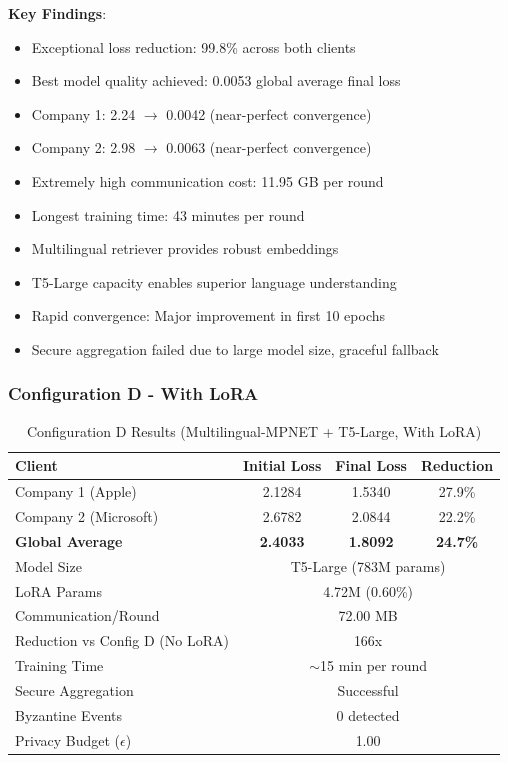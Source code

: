 \documentclass[conference]{IEEEtran}
\begin{document}
\textbf{Key Findings}:
\begin{itemize}
    \item Exceptional loss reduction: 99.8\% across both clients
    \item Best model quality achieved: 0.0053 global average final loss
    \item Company 1: 2.24 $\rightarrow$ 0.0042 (near-perfect convergence)
    \item Company 2: 2.98 $\rightarrow$ 0.0063 (near-perfect convergence)
    \item Extremely high communication cost: 11.95 GB per round
    \item Longest training time: 43 minutes per round
    \item Multilingual retriever provides robust embeddings
    \item T5-Large capacity enables superior language understanding
    \item Rapid convergence: Major improvement in first 10 epochs
    \item Secure aggregation failed due to large model size, graceful fallback
\end{itemize}

\subsubsection{Configuration D - With LoRA}

\begin{table}[h]
\centering
\caption{Configuration D Results (Multilingual-MPNET + T5-Large, With LoRA)}
\label{tab:config_d_with_lora}
\begin{tabular}{@{}lccc@{}}
\toprule
\textbf{Client} & \textbf{Initial Loss} & \textbf{Final Loss} & \textbf{Reduction} \\
\midrule
Company 1 (Apple) & 2.1284 & 1.5340 & 27.9\% \\
Company 2 (Microsoft) & 2.6782 & 2.0844 & 22.2\% \\
\midrule
\textbf{Global Average} & \textbf{2.4033} & \textbf{1.8092} & \textbf{24.7\%} \\
\midrule
Model Size & \multicolumn{3}{c}{T5-Large (783M params)} \\
LoRA Params & \multicolumn{3}{c}{4.72M (0.60\%)} \\
Communication/Round & \multicolumn{3}{c}{72.00 MB} \\
Reduction vs Config D (No LoRA) & \multicolumn{3}{c}{166x} \\
Training Time & \multicolumn{3}{c}{$\sim$15 min per round} \\
Secure Aggregation & \multicolumn{3}{c}{Successful} \\
Byzantine Events & \multicolumn{3}{c}{0 detected} \\
Privacy Budget ($\epsilon$) & \multicolumn{3}{c}{1.00} \\
\bottomrule
\end{tabular}
\end{table}
\end{document}
